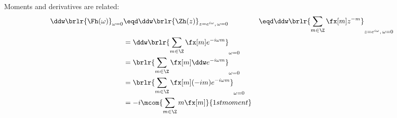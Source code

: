 \begin{remark}
Moments and derivatives are related:
\begin{align*}
  \ddw\brlr{\Fh(\omega)}_{\omega=0}
    &\eqd \ddw\brlr{\Zh(z)}_{z=e^{i\omega},\,\omega=0}
   &&\eqd \ddw\brlr{\sum_{m\in\Z} \fx[m] z^{-m}}_{z=e^{i\omega},\,\omega=0}
  \\&= \ddw\brlr{\sum_{m\in\Z} \fx[m] e^{-i\omega m}}_{\omega=0}
  \\&= \brlr{\sum_{m\in\Z} \fx[m] \ddw e^{-i\omega m}}_{\omega=0}
  \\&= \brlr{\sum_{m\in\Z} \fx[m] (-im) e^{-i\omega m}}_{\omega=0}
  \\&= -i \mcom{\sum_{m\in\Z} m \fx[m]}
               { 1st moment}
\end{align*}
\end{remark}
